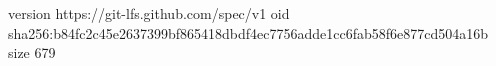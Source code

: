 version https://git-lfs.github.com/spec/v1
oid sha256:b84fc2c45e2637399bf865418dbdf4ec7756adde1cc6fab58f6e877cd504a16b
size 679
